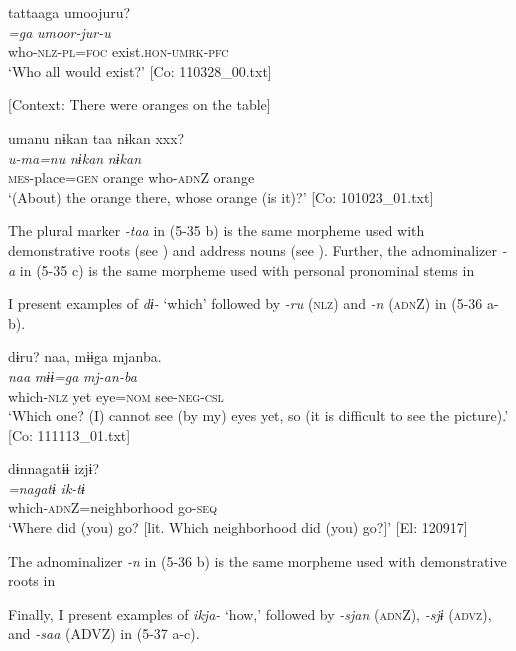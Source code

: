 \glll  tattaaga  umoojuru?\\
\textit{=ga}  \textit{umoor-jur-u}\\
who-\textsc{nlz}-\textsc{pl}=\textsc{foc}  exist.\textsc{hon}-\textsc{umrk}-\textsc{pfc}\\
\glt ‘Who all would exist?’ [Co: 110328\_00.txt]

 \ex \label{ex:5:c} [Context: There were oranges on the table]

\glll  umanu  nɨkan  taa  nɨkan   xxx?\\
\textit{u-ma=nu}  \textit{nɨkan}  \textit{}  \textit{nɨkan}  \\
\textsc{mes}-place=\textsc{gen}  orange  who-\textsc{adn}Z  orange  \\
\glt ‘(About) the orange there, whose orange (is it)?’ [Co: 101023\_01.txt]
\z
\z

The plural marker \textit{-taa} in (5-35 b) is the same morpheme used with demonstrative roots (see ) and address nouns (see ). Further, the adnominalizer \textit{{}-a} in (5-35 c) is the same morpheme used with personal pronominal stems in 

  I present examples of \textit{dɨ-} ‘which’ followed by \textit{{}-ru} (\textsc{nlz}) and \textit{{}-n} (\textsc{adn}Z) in (5-36 a-b).

\ea \label{ex:5:36}  \ea \label{ex:5:a} %
\glll  dɨru?  naa,  mɨɨga  mjanba.\\
\textit{}  \textit{naa}  \textit{mɨɨ=ga}  \textit{mj-an-ba}\\
which-\textsc{nlz}  yet  eye=\textsc{nom}  see-\textsc{neg}-\textsc{csl}\\
\glt ‘Which one? (I) cannot see (by my) eyes yet, so (it is difficult to see the picture).’ [Co: 111113\_01.txt]

 \ex \label{ex:5:b} %
\glll  dɨnnagatɨɨ  izjɨ?\\
\textit{=nagatɨ}  \textit{ik-tɨ}\\
which-\textsc{adn}Z=neighborhood  go-\textsc{seq}\\
\glt ‘Where did (you) go? [lit. Which neighborhood did (you) go?]’ [El: 120917]
\z
\z

The adnominalizer \textit{{}-n} in (5-36 b) is the same morpheme used with demonstrative roots in 

  Finally, I present examples of \textit{ikja-} ‘how,’ followed by \textit{{}-sjan} (\textsc{adn}Z), \textit{{}-sjɨ} (\textsc{advz}), and \textit{{}-saa} (ADVZ) in (5-37 a-c).

